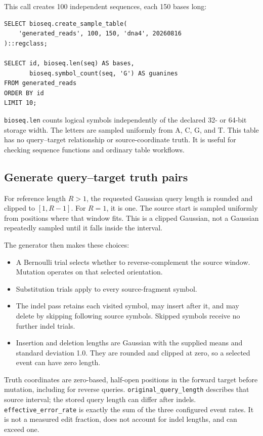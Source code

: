 This call creates 100 independent sequences, each 150 bases long:
\par\noindent\begin{minipage}{\linewidth}
\begin{lstlisting}[style=bioseq-appendix-sql]
SELECT bioseq.create_sample_table(
    'generated_reads', 100, 150, 'dna4', 20260816
)::regclass;

SELECT id, bioseq.len(seq) AS bases,
       bioseq.symbol_count(seq, 'G') AS guanines
FROM generated_reads
ORDER BY id
LIMIT 10;
\end{lstlisting}
\end{minipage}

\texttt{bioseq.len} counts logical symbols independently of the declared
32- or 64-bit storage width. The letters are sampled uniformly from A, C, G,
and T. This table has no
query--target relationship or source-coordinate truth. It is useful for
checking sequence functions and ordinary table workflows.

\subsection{Generate query--target truth pairs}

For reference length $R>1$, the requested Gaussian query length is rounded
and clipped to $[1,R-1]$. For $R=1$, it is one. The source start is sampled
uniformly from positions where that window fits. This is a clipped Gaussian,
not a Gaussian repeatedly sampled until it falls inside the interval.

The generator then makes these choices:
\begin{itemize}
  \item A Bernoulli trial selects whether to reverse-complement the source
        window. Mutation operates on that selected orientation.
  \item Substitution trials apply to every source-fragment symbol.
  \item The indel pass retains each visited symbol, may insert after it,
        and may delete by skipping following source symbols. Skipped symbols
        receive no further indel trials.
  \item Insertion and deletion lengths are Gaussian with the supplied means
        and standard deviation 1.0. They are rounded and clipped at zero,
        so a selected event can have zero length.
\end{itemize}

Truth coordinates are zero-based, half-open positions in the forward target
before mutation, including for reverse queries.
\texttt{original\_query\_length} describes that source interval; the stored
query length can differ after indels. \texttt{effective\_error\_rate} is
exactly the sum of the three configured event rates. It is not a measured
edit fraction, does not account for indel lengths, and can exceed one.

